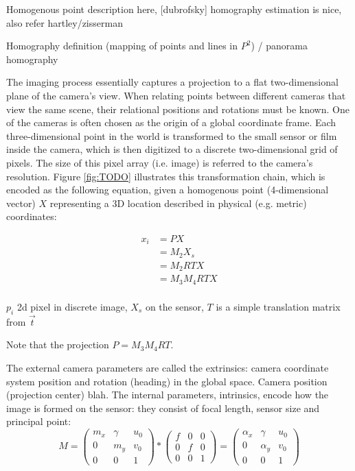 Homogenous point description here, [dubrofsky] homography estimation is nice, also refer hartley/zisserman

Homography definition (mapping of points and lines in $P^2$) / panorama homography

The imaging process essentially captures a projection to a flat two-dimensional plane of the camera's view.
When relating points between different cameras that view the same scene, their relational positions and rotations must be known.
One of the cameras is often chosen as the origin of a global coordinate frame.
Each three-dimensional point in the world is transformed to the small sensor or film inside the camera, which is then digitized to a discrete two-dimensional grid of pixels. The size of this pixel array (i.e. image) is referred to the camera's resolution.
Figure \ref{fig:TODO} illustrates this transformation chain, which is encoded as the following equation, given a homogenous point (4-dimensional vector) $X$ representing a 3D location described in physical (e.g. metric) coordinates:

\begin{align}
	x_i &= P X\\
	  &= M_2 X_s\\ %
	  &= M_2 R T X\\
	  &= M_3 M_4 R T X\\ %
\end{align}

$p_i$ 2d pixel in discrete image, $X_s$ on the sensor, $T$ is a simple translation matrix from $\vec t$

Note that the projection $P = M_3 M_4 R T$.

The external camera parameters are called the extrinsics: camera coordinate system position and rotation (heading) in the global space.
Camera position (projection center) blah.
The internal parameters, intrinsics, encode how the image is formed on the sensor: they consist of focal length, sensor size and principal point:
\begin{equation}
	M =
	\begin{pmatrix}
		m_x & \gamma & u_0\\
		0   &    m_y & v_0\\
		0   &        0 & 1
	\end{pmatrix}
	*
	\begin{pmatrix}
		f & 0 & 0\\
		0 & f & 0\\
		0 & 0 & 1
	\end{pmatrix}
	=
	\begin{pmatrix}
		\alpha_x & \gamma   & u_0\\
		0        & \alpha_y & v_0\\
		0        & 0        & 1
	\end{pmatrix}
\end{equation}

